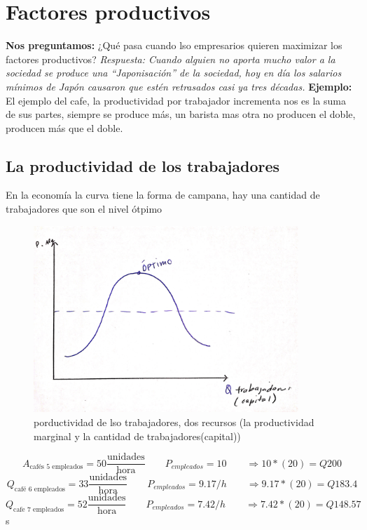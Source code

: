 \section{Factores productivos}
\textbf{Nos preguntamos:} ¿Qué pasa cuando lso empresarios quieren maximizar los factores productivos? \emph{Respuesta: Cuando alguien no aporta mucho valor a la sociedad se produce una ``Japonisación'' de la sociedad, hoy en día los salarios mínimos de Japón causaron que estén retrasados casi ya tres décadas.} \textbf{Ejemplo: } El ejemplo del cafe, la productividad por trabajador incrementa nos es la suma de sus partes, siempre se produce más, un barista mas otra no producen el doble, producen más que el doble. \newline 

\subsection{La productividad de los trabajadores}
En la economía la curva tiene la forma de campana, hay una cantidad de trabajadores que son el nivel ótpimo
\begin{figure}[htbp]
    \centering
    \includegraphics[width=10cm]{Classes/Images/2019-07-31-1}
    \caption{porductividad de lso trabajadores, dos recursos (la productividad marginal y la cantidad de trabajadores(capital))}
    \label{}
\end{figure} 

\[
  A_{\text{cafés 5 empleados}} = 50 \frac{\text{unidades}}{\text{hora}}\qquad P_{empleados} = 10 \qquad\Rightarrow  10*(20) = Q200
\]
\[
  Q_{\text{café 6 empleados}} = 33 \frac{\text{unidades}}{\text{hora}}  \qquad P_{empleados} = 9.17/h \qquad \Rightarrow  9.17*(20) = Q183.4
\]
\[
  Q_{\text{cafe 7 empleados}} = 52 \frac{\text{unidades}}{\text{hora}}\qquad P_{empleados} = 7.42/h \qquad \Rightarrow  7.42*(20) = Q148.57
\]s


